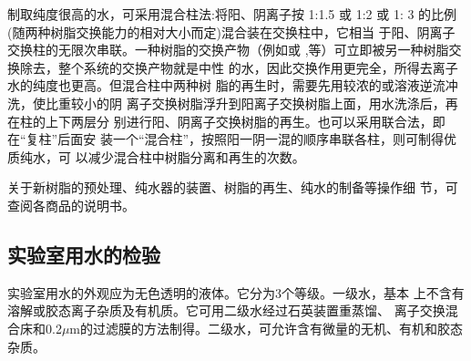 制取纯度很高的水，可采用混合柱法:将阳、阴离子按 1:1.5 或 1:2 或 1:
3 的比例(随两种树脂交换能力的相对大小而定)混合装在交换柱中，它相当
于阳、阴离子交换柱的无限次串联。一种树脂的交换产物（例如或
,等）可立即被另一种树脂交换除去，整个系统的交换产物就是中性
的水，因此交换作用更完全，所得去离子水的纯度也更高。但混合柱中两种树
脂的再生时，需要先用较浓的或溶液逆流冲洗，使比重较小的阴
离子交换树脂浮升到阳离子交换树脂上面，用水洗涤后，再在柱的上下两层分
别进行阳、阴离子交换树脂的再生。也可以采用联合法，即在“复柱”后面安
装一个“混合柱”，按照阳一阴一混的顺序串联各柱，则可制得优质纯水，可
以减少混合柱中树脂分离和再生的次数。

关于新树脂的预处理、纯水器的装置、树脂的再生、纯水的制备等操作细
节，可查阅各商品的说明书。

\subsection{实验室用水的检验}

实验室用水的外观应为无色透明的液体。它分为3个等级。一级水，基本
上不含有溶解或胶态离子杂质及有机质。它可用二级水经过石英装置重蒸馏、
离子交换混合床和0.2$\mu$m的过滤膜的方法制得。二级水，可允许含有微量的无机、有机和胶态杂质。
